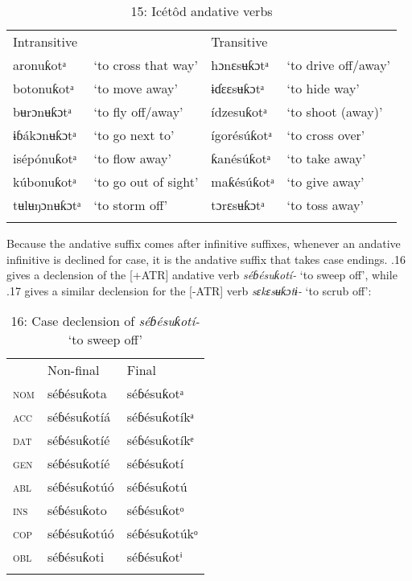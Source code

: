 \begin{table}
\caption{15: Icétôd andative verbs}
\label{tab:8}


\begin{tabularx}{\textwidth}{XXXX}
\lsptoprule

Intransitive &  & \multicolumn{2}{X}{Transitive}\\
aronuƙotᵃ & ‘to cross that way’ & hɔnɛsʉƙɔtᵃ & ‘to drive off/away’\\
botonuƙotᵃ & ‘to move away’ & ɨɗɛɛsʉƙɔtᵃ & ‘to hide way’\\
bʉrɔnʉƙɔtᵃ & ‘to fly off/away’ & ídzesuƙotᵃ & ‘to shoot (away)’\\
ɨɓákɔnʉƙɔtᵃ & ‘to go next to’ & ígorésúƙotᵃ & ‘to cross over’\\
isépónuƙotᵃ & ‘to flow away’ & ƙanésúƙotᵃ & ‘to take away’\\
kúbonuƙotᵃ & ‘to go out of sight’ & maƙésúƙotᵃ & ‘to give away’\\
tʉlʉŋɔnʉƙɔtᵃ & ‘to storm off’ & tɔrɛsʉƙɔtᵃ & ‘to toss away’\\
\lspbottomrule
\end{tabularx}
\end{table}
Because the andative suffix comes after infinitive suffixes, whenever an andative infinitive is declined for case, it is the andative suffix that takes case endings. .16 gives a declension of the [+ATR] andative verb \textit{séɓésuƙotí-} ‘to sweep off’, while .17 gives a similar declension for the [-ATR] verb \textit{sɛkɛsʉƙɔtɨ-} ‘to scrub off’:


\begin{table}
\caption{16: Case declension of \textit{séɓésuƙotí-} ‘to sweep off’}
\label{tab:8}


\begin{tabularx}{\textwidth}{XXX} & Non-final & Final\\
\lsptoprule
\textsc{nom} & séɓésuƙota & séɓésuƙotᵃ\\
\textsc{acc} & séɓésuƙotíá & séɓésuƙotíkᵃ\\
\textsc{dat} & séɓésuƙotíé & séɓésuƙotíkᵉ\\
\textsc{gen} & séɓésuƙotíé & séɓésuƙotí\\
\textsc{abl} & séɓésuƙotúó & séɓésuƙotú\\
\textsc{ins} & séɓésuƙoto & séɓésuƙotᵒ\\
\textsc{cop} & séɓésuƙotúó & séɓésuƙotúkᵒ\\
\textsc{obl} & séɓésuƙoti & séɓésuƙotⁱ\\
\lspbottomrule
\end{tabularx}
\end{table}

